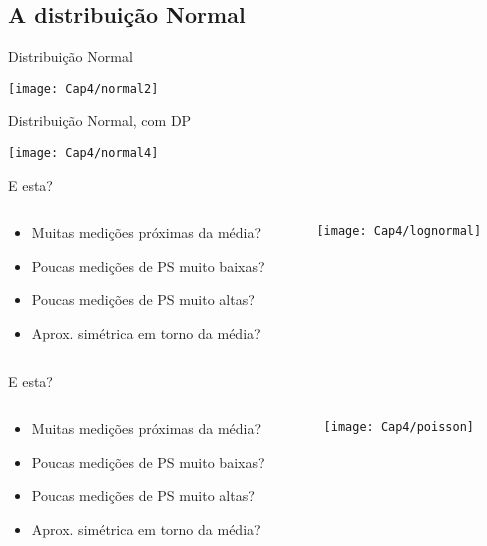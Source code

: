 \documentclass{beamer}
\begin{document}
\subsection{A distribuição Normal}


\begin{frame}{Distribuição Normal}
  \begin{center}
    \texttt{[image: Cap4/normal2]}
  \end{center}
\end{frame}

\begin{frame}{Distribuição Normal, com DP}
  \begin{center}
    \texttt{[image: Cap4/normal4]}
  \end{center}
\end{frame}

\begin{frame}{E esta?}
  \begin{columns}
    \begin{column}{5cm}
      \begin{itemize}
      \item Muitas medições próximas da média?
      \item Poucas medições de PS muito baixas?
      \item Poucas medições de PS muito altas?
      \item Aprox. simétrica em torno da média?
      \end{itemize}
    \end{column}
    \begin{column}{5cm}
      \texttt{[image: Cap4/lognormal]}
    \end{column}
  \end{columns}
\end{frame}

\begin{frame}{E esta?}
  \begin{columns}
    \begin{column}{5cm}
      \begin{itemize}
      \item Muitas medições próximas da média?
      \item Poucas medições de PS muito baixas?
      \item Poucas medições de PS muito altas?
      \item Aprox. simétrica em torno da média?
      \end{itemize}
    \end{column}
    \begin{column}{5cm}
      \texttt{[image: Cap4/poisson]}
    \end{column}
  \end{columns}
\end{frame}
\end{document}
